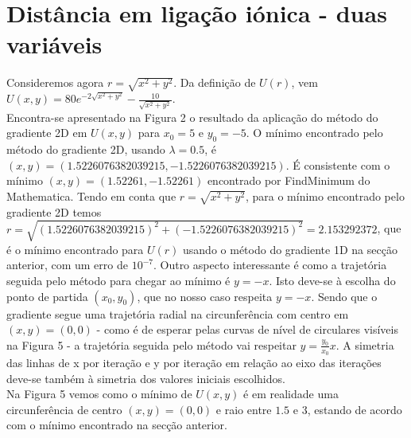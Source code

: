 \documentclass[aps,pre,twocolumn,showpacs,amsmath,amssymb]{revtex4-1}
\begin{document}
\section{Distância em ligação iónica - duas variáveis}
Consideremos agora $r=\sqrt{x^2+y^2}$. Da definição de $U(r)$, vem
$U(x,y)=80e^{-2\sqrt{x^2+y^2}}-\frac{10}{\sqrt{x^2+y^2}}.$\\
Encontra-se apresentado na Figura 2 o resultado da aplicação do método do gradiente 2D em $U(x,y)$ para $x_0=5$ e $y_0=-5$.
O mínimo encontrado pelo método do gradiente 2D, usando $\lambda=0.5$, é $(x,y)=(1.5226076382039215,-1.5226076382039215)$. É consistente com o mínimo $(x,y)=(1.52261,-1.52261)$ encontrado por FindMinimum do Mathematica.
Tendo em conta que $r=\sqrt{x^2+y^2}$, para o mínimo encontrado pelo gradiente 2D temos $r=\sqrt{(1.5226076382039215)^2+(-1.5226076382039215)^2}=2.153292372$, que é o mínimo encontrado para $U(r)$ usando o método do gradiente 1D na secção anterior, com um erro de $10^{-7}$. Outro aspecto interessante é como a trajetória seguida pelo método para chegar ao mínimo é $y=-x$. Isto deve-se à escolha do ponto de partida $(x_0,y_0)$, que no nosso caso respeita $y=-x$. Sendo que o gradiente segue uma trajetória radial na circunferência com centro em $(x,y)=(0,0)$ - como é de esperar pelas curvas de nível de circulares visíveis na Figura 5 - a trajetória seguida pelo método vai respeitar $y=\frac{y_0}{x_0}x$. A simetria das linhas de x por iteração e y por iteração em relação ao eixo das iterações deve-se também à simetria dos valores iniciais escolhidos.\\

Na Figura 5 vemos como o mínimo de $U(x,y)$ é em realidade uma circunferência de centro $(x,y)=(0,0)$ e raio entre $1.5$ e $3$, estando de acordo com o mínimo encontrado na secção anterior.
\end{document}
